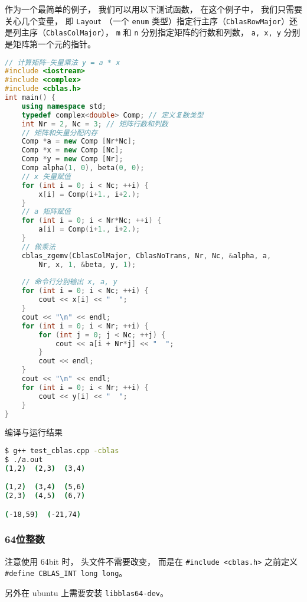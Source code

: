 作为一个最简单的例子， 我们可以用以下测试函数， 在这个例子中， 我们只需要关心几个变量， 即 \verb|Layout| （一个 \verb|enum| 类型）指定行主序（\verb|CblasRowMajor|）还是列主序（\verb|CblasColMajor|）， \verb|m| 和 \verb|n| 分别指定矩阵的行数和列数， \verb|a, x, y| 分别是矩阵第一个元的指针。
\begin{lstlisting}[language=cpp, caption=blas\_demo.cpp]
// 计算矩阵—矢量乘法 y = a * x
#include <iostream>
#include <complex>
#include <cblas.h>
int main() {
    using namespace std;
    typedef complex<double> Comp; // 定义复数类型
    int Nr = 2, Nc = 3; // 矩阵行数和列数
    // 矩阵和矢量分配内存
    Comp *a = new Comp [Nr*Nc];
    Comp *x = new Comp [Nc];
    Comp *y = new Comp [Nr];
    Comp alpha(1, 0), beta(0, 0);
    // x 矢量赋值
    for (int i = 0; i < Nc; ++i) {
        x[i] = Comp(i+1., i+2.);
    }
    // a 矩阵赋值
    for (int i = 0; i < Nr*Nc; ++i) {
        a[i] = Comp(i+1., i+2.);
    }
    // 做乘法
    cblas_zgemv(CblasColMajor, CblasNoTrans, Nr, Nc, &alpha, a,
        Nr, x, 1, &beta, y, 1);
        
    // 命令行分别输出 x, a, y
    for (int i = 0; i < Nc; ++i) {
        cout << x[i] << "  ";
    }
    cout << "\n" << endl;
    for (int i = 0; i < Nr; ++i) {
        for (int j = 0; j < Nc; ++j) {
            cout << a[i + Nr*j] << "  ";
        }
        cout << endl;
    }
    cout << "\n" << endl;
    for (int i = 0; i < Nr; ++i) {
        cout << y[i] << "  ";
    }
}
\end{lstlisting}

编译与运行结果
\begin{lstlisting}[language=bash]
$ g++ test_cblas.cpp -cblas
$ ./a.out
(1,2)  (2,3)  (3,4)

(1,2)  (3,4)  (5,6)
(2,3)  (4,5)  (6,7)

(-18,59)  (-21,74)
\end{lstlisting}

\subsubsection{64位整数}
注意使用 64bit 时， 头文件不需要改变， 而是在 \verb|#include <cblas.h>| 之前定义 \verb|#define CBLAS_INT long long|。

另外在 ubuntu 上需要安装 \verb|libblas64-dev|。

